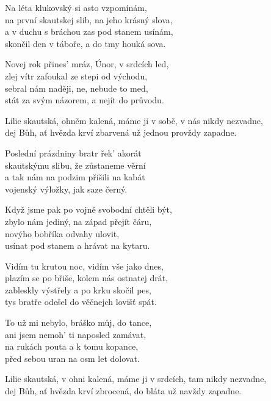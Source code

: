 
\ve{}
Na léta klukovský si asto vzpomínám,\\
na první skautskej slib, na jeho krásný slova,\\
a v duchu s bráchou zas pod stanem usínám,\\
skončil den v táboře, a do tmy houká sova.

Novej rok přines' mráz, Únor, v srdcích led,\\
zlej vítr zafoukal ze stepi od východu,\\
sebral nám naději, ne, nebude to med,\\
stát za svým názorem, a nejít do průvodu.

\cho{}
Lilie skautská, ohněm kalená, máme ji v sobě, v nás nikdy nezvadne,\\
dej Bůh, ať hvězda krví zbarvená už jednou provždy zapadne.

\ve{}
Poslední prázdniny bratr řek' akorát\\
skautskýmu slibu, že zůstaneme věrní\\
a tak nám na podzim přišili na kabát\\
vojenský výložky, jak saze černý.

Když jsme pak po vojně svobodní chtěli být,\\
zbylo nám jediný, na západ přejít čáru,\\
novýho bobříka odvahy ulovit,\\
usínat pod stanem a hrávat na kytaru.

\cho{}

\ve{}
Vidím tu krutou noc, vidím vše jako dnes,\\
plazím se po břiše, kolem nás ostnatej drát,\\
zableskly výstřely a po krku skočil pes,\\
tys bratře odešel do věčnejch lovišť spát.

To už mi nebylo, bráško můj, do tance,\\
ani jsem nemoh' ti naposled zamávat,\\
na rukách pouta a k tomu kopance,\\
před sebou uran na osm let dolovat.

\cho{}

\cho{}
Lilie skautská, v ohni kalená, máme ji v srdcích, tam nikdy nezvadne,\\
dej Bůh, ať hvězda krví zbrocená, do bláta už navždy zapadne.

\esong